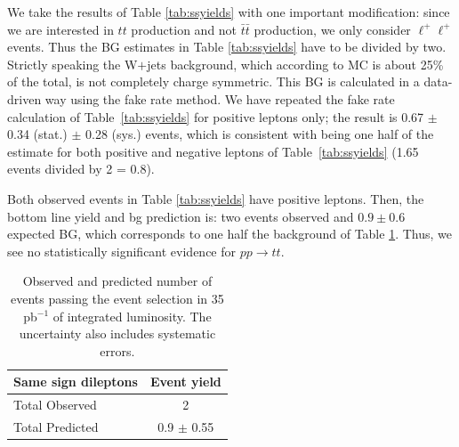 We take the results of Table \ref{tab:ssyields} with one important modification: 
since we are interested in $tt$ production and not $\bar{t}\bar{t}$ production,
we only consider $\ell^{+}\ell^{+}$ events.  
Thus the BG estimates in Table \ref{tab:ssyields} have to be divided by two.
Strictly speaking the W$+$jets background, which according to MC is about 25\%
of the total, is not completely charge symmetric.  
This BG is calculated in a data-driven 
way using the fake rate method.  We have repeated the fake rate calculation
of Table~\ref{tab:ssyields} for positive leptons only; the result is 
0.67 $\pm$ 0.34 (stat.) $\pm$ 0.28 (sys.) events, which is consistent with being one half of the estimate for both
positive and negative leptons of Table~\ref{tab:ssyields}  (1.65 events divided
by 2 = 0.8).

Both observed events in Table \ref{tab:ssyields} have positive leptons.  
Then, the bottom line yield and bg prediction is: 
two events observed and $0.9 \pm 0.6$ expected BG, 
which corresponds to one half the background of Table \ref{tab:sm_preditcion}.
Thus, we see no statistically significant evidence for $pp \to tt$.





\begin{table}[hbt]
\begin{center}
\begin{tabular}{|l|c|}\hline
Same sign dileptons & Event yield \\ \hline
Total Observed & 2 \\
Total Predicted & 0.9 $\pm$ 0.55 \\
\hline
\end{tabular}
\caption{ Observed and predicted number of events passing the event selection in 35 pb$^{-1}$ of integrated luminosity. 
The uncertainty also includes systematic errors.\label{tab:sm_preditcion}}
\end{center}
\end{table}


